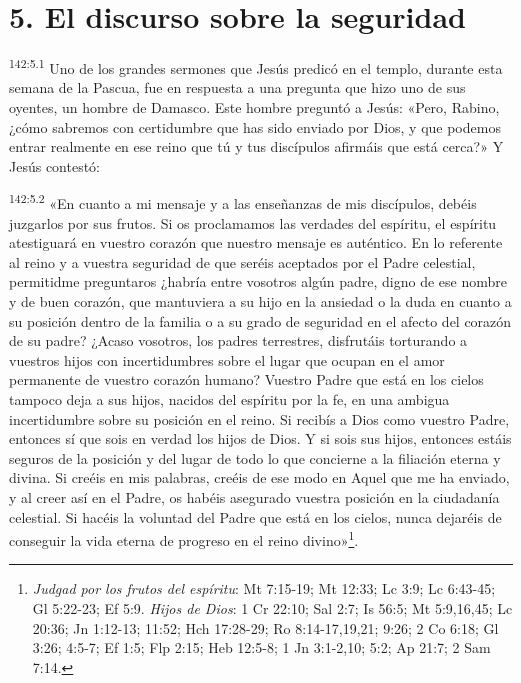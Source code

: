 \section*{5. El discurso sobre la seguridad}
\par
\textsuperscript{142:5.1} Uno de los grandes sermones que Jesús predicó en el templo, durante esta semana de la Pascua, fue en respuesta a una pregunta que hizo uno de sus oyentes, un hombre de Damasco. Este hombre preguntó a Jesús: «Pero, Rabino, ¿cómo sabremos con certidumbre que has sido enviado por Dios, y que podemos entrar realmente en ese reino que tú y tus discípulos afirmáis que está cerca?» Y Jesús contestó:

\par
\textsuperscript{142:5.2} «En cuanto a mi mensaje y a las enseñanzas de mis discípulos, debéis juzgarlos por sus frutos. Si os proclamamos las verdades del espíritu, el espíritu atestiguará en vuestro corazón que nuestro mensaje es auténtico. En lo referente al reino y a vuestra seguridad de que seréis aceptados por el Padre celestial, permitidme preguntaros ¿habría entre vosotros algún padre, digno de ese nombre y de buen corazón, que mantuviera a su hijo en la ansiedad o la duda en cuanto a su posición dentro de la familia o a su grado de seguridad en el afecto del corazón de su padre? ¿Acaso vosotros, los padres terrestres, disfrutáis torturando a vuestros hijos con incertidumbres sobre el lugar que ocupan en el amor permanente de vuestro corazón humano? Vuestro Padre que está en los cielos tampoco deja a sus hijos, nacidos del espíritu por la fe, en una ambigua incertidumbre sobre su posición en el reino. Si recibís a Dios como vuestro Padre, entonces sí que sois en verdad los hijos de Dios. Y si sois sus hijos, entonces estáis seguros de la posición y del lugar de todo lo que concierne a la filiación eterna y divina. Si creéis en mis palabras, creéis de ese modo en Aquel que me ha enviado, y al creer así en el Padre, os habéis asegurado vuestra posición en la ciudadanía celestial. Si hacéis la voluntad del Padre que está en los cielos, nunca dejaréis de conseguir la vida eterna de progreso en el reino divino»\footnote{\textit{Judgad por los frutos del espíritu}: Mt 7:15-19; Mt 12:33; Lc 3:9; Lc 6:43-45; Gl 5:22-23; Ef 5:9. \textit{Hijos de Dios}: 1 Cr 22:10; Sal 2:7; Is 56:5; Mt 5:9,16,45; Lc 20:36; Jn 1:12-13; 11:52; Hch 17:28-29; Ro 8:14-17,19,21; 9:26; 2 Co 6:18; Gl 3:26; 4:5-7; Ef 1:5; Flp 2:15; Heb 12:5-8; 1 Jn 3:1-2,10; 5:2; Ap 21:7; 2 Sam 7:14.}.

